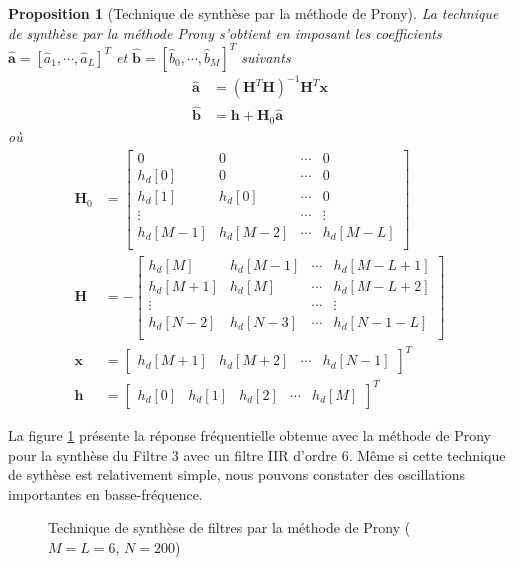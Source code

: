 \documentclass[11pt,a4paper]{IEEEtran}
\newtheorem{proposition}{Proposition}
\begin{document}
\begin{proposition}[Technique de synthèse par la méthode de Prony]\label{prop_prony}
La technique de synthèse par la méthode Prony s'obtient en imposant les coefficients $\widehat{\textbf{a}}=[\widehat{a}_1,\cdots,\widehat{a}_L]^T$ et $\widehat{\textbf{b}}=[\widehat{b}_0,\cdots,\widehat{b}_M]^T$ suivants
\begin{align}
\widehat{\textbf{a}}&=(\textbf{H}^T\textbf{H})^{-1}\textbf{H}^T\textbf{x}\\
\widehat{\textbf{b}}&=\textbf{h}+\textbf{H}_0\widehat{\textbf{a}}
\end{align}
où
\begin{align*}
\textbf{H}_0&=\begin{bmatrix} 0&0&\cdots&0\\
h_d[0]&0&\cdots&0\\
h_d[1]&h_d[0]&\cdots&0\\
\vdots& &\cdots&\vdots\\
h_d[M-1]&h_d[M-2]&\cdots&h_d[M-L]\\
\end{bmatrix}\\
\textbf{H}&=-\begin{bmatrix} h_d[M]&h_d[M-1]&\cdots&h_d[M-L+1]\\
h_d[M+1]&h_d[M]&\cdots&h_d[M-L+2]\\
\vdots& &\cdots&\vdots\\
h_d[N-2]&h_d[N-3]&\cdots&h_d[N-1-L]\\
\end{bmatrix}\\
\textbf{x}&=\begin{bmatrix} h_d[M+1]&h_d[M+2]&\cdots &h_d[N-1]\end{bmatrix}^T\\
\textbf{h}&=\begin{bmatrix} h_d[0]&h_d[1]&h_d[2]&\cdots &h_d[M]\end{bmatrix}^T
\end{align*}
\end{proposition}

La figure \ref{fig_iir_prony} présente la réponse fréquentielle obtenue avec la méthode de Prony pour la synthèse du Filtre 3 avec un filtre IIR d'ordre $6$. Même si cette technique de sythèse est relativement simple, nous pouvons constater des oscillations importantes en basse-fréquence. 

\begin{figure}[t]
\centering
{}
\caption{Technique de synthèse de filtres par la méthode de Prony ($M=L=6$, $N=200$)}\label{fig_iir_prony}
\end{figure}
\end{document}
